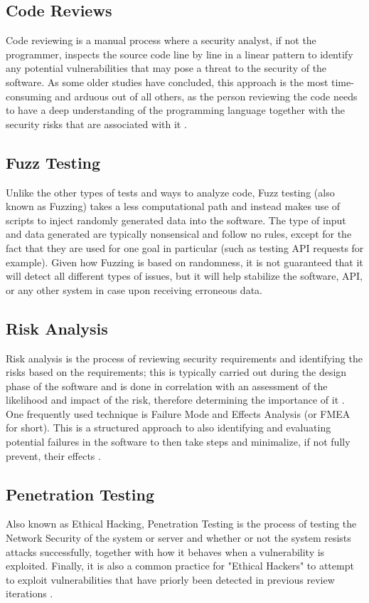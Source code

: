 \subsection{Code Reviews}
Code reviewing is a manual process where a security analyst, if not the programmer, inspects the source code line by line in a linear pattern to identify any potential vulnerabilities that may pose a threat to the security of the software. As some older studies have concluded, this approach is the most time-consuming and arduous out of all others, as the person reviewing the code needs to have a deep understanding of the programming language together with the security risks that are associated with it \cite{ackerman1984software,fagan2002design}.

\subsection{Fuzz Testing}
Unlike the other types of tests and ways to analyze code, Fuzz testing (also known as Fuzzing) takes a less computational path and instead makes use of scripts to inject randomly generated data into the software. The type of input and data generated are typically nonsensical and follow no rules, except for the fact that they are used for one goal in particular (such as testing API requests for example). Given how Fuzzing is based on randomness, it is not guaranteed that it will detect all different types of issues, but it will help stabilize the software, API, or any other system in case upon receiving erroneous data. 

\subsection{Risk Analysis}
Risk analysis is the process of reviewing security requirements and identifying the risks based on the requirements; this is typically carried out during the design phase of the software and is done in correlation with an assessment of the likelihood and impact of the risk, therefore determining the importance of it \cite{khan2012systematic}. One frequently used technique is Failure Mode and Effects Analysis (or FMEA for short). This is a structured approach to also identifying and evaluating potential failures in the software to then take steps and minimalize, if not fully prevent, their effects \cite{lipol2011risk}. 

\subsection{Penetration Testing}
Also known as Ethical Hacking, Penetration Testing is the process of testing the Network Security of the system or server and whether or not the system resists attacks successfully, together with how it behaves when a vulnerability is exploited. Finally, it is also a common practice for "Ethical Hackers" to attempt to exploit vulnerabilities that have priorly been detected in previous review iterations \cite{caballero2007polyglot}.

